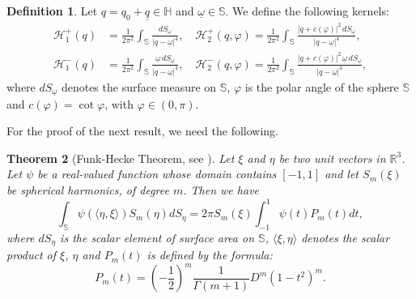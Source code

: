\documentclass[reqno,11pt]{amsart}
\numberwithin{equation}{section}
\newcommand{\unq}{\underline{q}}
\newtheorem{theorem}{Theorem}[section]
\theoremstyle{definition}
\newtheorem{definition}[theorem]{Definition}
\begin{document}
\begin{definition} \label{d1_2}
	Let $q = q_0 + \unq \in \mathbb{H}$ and $\underline{\omega} \in \mathbb{S}$. We define the following kernels:
	\begin{align*}
		\mathcal H^+_1 (q) &=\frac{1}{2 \pi^2} \int_{\mathbb S} \frac{dS_{\underline{\omega}}}{|q-\underline{\omega}|^4},
		\quad
		\mathcal H^+_2 (q, \varphi) = \frac{1}{2 \pi^2} \int_{\mathbb S} \frac{|q+c(\varphi)|^2 \, dS_{\underline{\omega}}}{|q-\underline{\omega}|^4}, \\
		\mathcal H^-_1 (q) &= \frac{1}{2 \pi^2} \int_{\mathbb S} \frac{\underline{\omega} \, dS_{\underline{\omega}}}{|q-\underline{\omega}|^4},
		\quad
		\mathcal H^-_2 (q, \varphi) = \frac{1}{2 \pi^2} \int_{\mathbb S} \frac{|q+c(\varphi)|^2 \, \underline{\omega} \, dS_{\underline{\omega}}}{|q-\underline{\omega}|^4},
	\end{align*}
	where $dS_{\underline{\omega}}$ denotes the surface measure on $\mathbb{S}$, $\varphi$ is the polar angle of the sphere $\mathbb{S}$ and $c(\varphi)=\cot \varphi$, with $\varphi \in (0, \pi)$.
\end{definition}
For the proof of the next result, we need the following.
\begin{theorem}[Funk-Hecke Theorem, see \cite{HOCH}]\label{F_H} Let $\xi$ and $\eta$ be two unit vectors in $\mathbb R^3$. Let $\psi$ be a real-valued function whose domain contains $[-1,1]$ and let $S_m(\xi)$ be spherical harmonics, of degree $m$. Then we have
	$$ \int_{\mathbb S}\psi(\langle \eta,\xi \rangle) S_m(\eta) dS_\eta=2 \pi S_m(\xi)\int_{-1}^1 \psi(t) P_m(t)dt, $$
	where $dS_\eta$ is the scalar element of surface area on $\mathbb S$, $\langle\xi,\eta \rangle$ denotes the scalar product of $\xi$, $\eta$ and $P_m(t)$ is defined by the formula:
	$$ P_m(t)=\left( -\frac 12 \right)^m \frac{1}{\Gamma(m+1)} D^m(1-t^2)^{m}. $$
\end{theorem}
\end{document}
